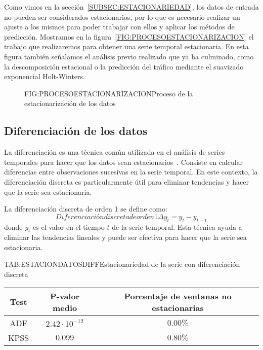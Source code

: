 Como vimos en la sección~\ref{SUBSEC:ESTACIONARIEDAD}, los datos de entrada no pueden ser considerados estacionarios, por lo que es necesario realizar un ajuste a los mismos para poder trabajar con ellos y aplicar los métodos de predicción.
Mostramos en la figura~\ref{FIG:PROCESOESTACIONARIZACION} el trabajo que realizaremos para obtener una serie temporal estacionaria. En esta figura también señalamos el análisis previo realizado que ya ha culminado, como la descomposición estacional o la predicción del tráfico mediante el suavizado exponencial Holt-Winters.

\begin{figure}[Proceso de la estacionarización de los datos]{FIG:PROCESOESTACIONARIZACION}{Proceso de la estacionarización de los datos}
\end{figure}

\subsection{Diferenciaci\'on de los datos}

La diferenciación es una técnica común utilizada en el análisis de series temporales para hacer que los datos sean estacionarios~\cite{box2015time}. Consiste en calcular diferencias entre observaciones sucesivas en la serie temporal. En este contexto, la diferenciación discreta es particularmente útil para eliminar tendencias y hacer que la serie sea estacionaria.

La diferenciación discreta de orden 1 se define como:
\begin{equation}{Diferenciación discreta de orden 1}    
    \Delta y_t = y_t - y_{t-1}
\end{equation}
donde \( y_t \) es el valor en el tiempo \( t \) de la serie temporal. Esta técnica ayuda a eliminar las tendencias lineales y puede ser efectiva para hacer que la serie sea estacionaria.

\begin{table}[Estacionariedad de la serie con diferenciación discreta]{TAB:ESTACIONDATOSDIFF}{Estacionariedad de la serie con diferenciación discreta}
    \begin{tabular}{|c|c|c|}
        \hline
        \textbf{Test} & \textbf{P-valor medio} & \textbf{Porcentaje de ventanas no estacionarias} \\
        \hline
        ADF & $2.42\cdot 10^{-12}$ & $0.00\%$ \\
        KPSS & $0.099$ & $0.80\%$ \\
        \hline
    \end{tabular}
\end{table}

